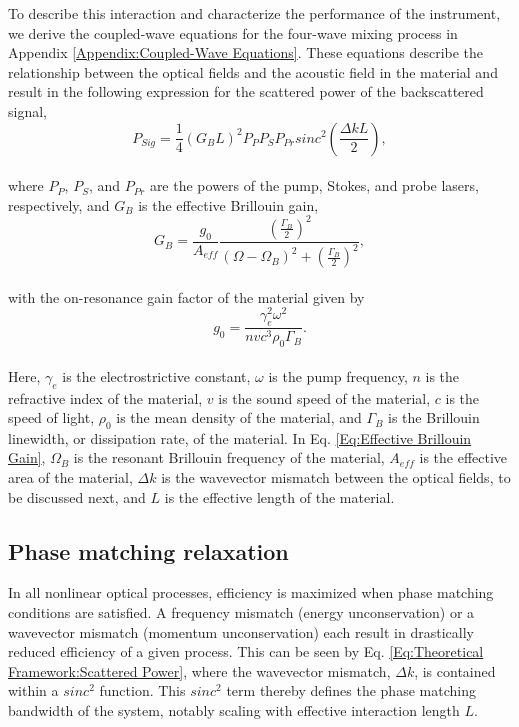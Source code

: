 \documentclass[%
  reprint,
  superscriptaddress,
  amsmath,amssymb,
  aps,
  prapplied,
]{revtex4-2}
\begin{document}
To describe this interaction and characterize the performance of the instrument, we derive the coupled-wave equations for the four-wave mixing process in Appendix \ref{Appendix:Coupled-Wave Equations}. These equations describe the relationship between the optical fields and the acoustic field in the material and result in the following expression for the scattered power of the backscattered signal,
\\
\begin{equation}
  P_{Sig} = \frac{1}{4}(G_{B}L)^{2}P_{P}P_{S}P_{Pr}sinc^{2}\left(\frac{\Delta kL}{2}\right),
  \label{Eq:Theoretical Framework:Scattered Power} %
\end{equation}
\\
where $P_{P}$, $P_{S}$, and $P_{Pr}$ are the powers of the pump, Stokes, and probe lasers, respectively, and $G_{B}$ is the effective Brillouin gain,
\\
\begin{equation}
  G_{B} = \frac{g_{0}}{A_{eff}}\frac{\left(\frac{\Gamma_{B}}{2}\right)^{2}}{(\Omega - \Omega_{B})^{2} + \left(\frac{\Gamma_{B}}{2}\right)^{2}},
  \label{Eq:Effective Brillouin Gain}
\end{equation}
\\
with the on-resonance gain factor of the material given by
\\
\begin{equation}
  g_{0} = \frac{\gamma_{e}^{2}\omega^{2}}{nvc^{3}\rho_{0}\Gamma_{B}}.
\end{equation}
\\
Here, $\gamma_{e}$ is the electrostrictive constant, $\omega$ is the pump frequency, $n$ is the refractive index of the material, $v$ is the sound speed of the material, $c$ is the speed of light, $\rho_{0}$ is the mean density of the material, and $\Gamma_{B}$ is the Brillouin linewidth, or dissipation rate, of the material. In Eq. \ref{Eq:Effective Brillouin Gain}, $\Omega_{B}$ is the resonant Brillouin frequency of the material, $A_{eff}$ is the effective area of the material, $\Delta k$ is the wavevector mismatch between the optical fields, to be discussed next, and $L$ is the effective length of the material.


\subsection*{Phase matching relaxation}
\label{Theoretical Framework: Phase matching relaxation}
In all nonlinear optical processes, efficiency is maximized when phase matching conditions are satisfied. A frequency mismatch (energy unconservation) or a wavevector mismatch (momentum unconservation) each result in drastically reduced efficiency of a given process.\cite{maker1962effects} This can be seen by Eq. \ref{Eq:Theoretical Framework:Scattered Power}, where the wavevector mismatch, $\Delta k$, is contained within a $sinc^{2}$ function. This $sinc^{2}$ term thereby defines the phase matching bandwidth of the system, notably scaling with effective interaction length $L$.
\end{document}
